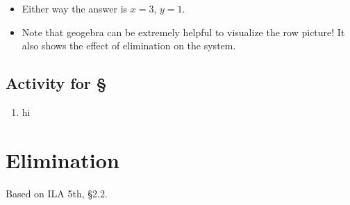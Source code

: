 \documentclass[11pt,oneside]{amsbook}
\theoremstyle{definition}
\theoremstyle{plain}
\theoremstyle{definition}
\theoremstyle{remark}
\numberwithin{equation}{section}
\numberwithin{figure}{section}
\begin{document}
\begin{itemize}
  (figure)
\item Either way the answer is $x=3$, $y=1$.
\item Note that geogebra can be extremely helpful to visualize the row picture! It also shows the effect of elimination on the system.
\end{itemize}

\newpage
\subsection*{Activity for \S \thesection}

\begin{enumerate}
  \item hi
\end{enumerate}

\newpage
\section{Elimination}

Based on ILA 5th, \S 2.2.
\end{document}
